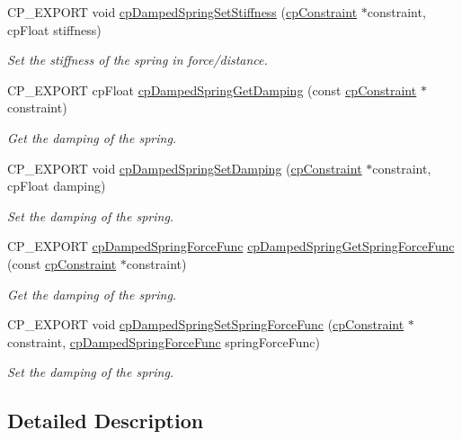\begin{DoxyCompactItemize}
C\+P\+\_\+\+E\+X\+P\+O\+RT void \hyperlink{group__cpDampedSpring_gafb0a681c3c2ec31001bd55be1080beda}{cp\+Damped\+Spring\+Set\+Stiffness} (\hyperlink{structcpConstraint}{cp\+Constraint} $\ast$constraint, cp\+Float stiffness)
\begin{DoxyCompactList}\small\item\em Set the stiffness of the spring in force/distance. \end{DoxyCompactList}\item 
\mbox{\label{group__cpDampedSpring_gaa97fd3bd3901c0366d12bfc8308213b7}} 
C\+P\+\_\+\+E\+X\+P\+O\+RT cp\+Float \hyperlink{group__cpDampedSpring_gaa97fd3bd3901c0366d12bfc8308213b7}{cp\+Damped\+Spring\+Get\+Damping} (const \hyperlink{structcpConstraint}{cp\+Constraint} $\ast$constraint)
\begin{DoxyCompactList}\small\item\em Get the damping of the spring. \end{DoxyCompactList}\item 
\mbox{\label{group__cpDampedSpring_ga88177eeb62c14005496c38c9b6d8669d}} 
C\+P\+\_\+\+E\+X\+P\+O\+RT void \hyperlink{group__cpDampedSpring_ga88177eeb62c14005496c38c9b6d8669d}{cp\+Damped\+Spring\+Set\+Damping} (\hyperlink{structcpConstraint}{cp\+Constraint} $\ast$constraint, cp\+Float damping)
\begin{DoxyCompactList}\small\item\em Set the damping of the spring. \end{DoxyCompactList}\item 
\mbox{\label{group__cpDampedSpring_ga8b377b8e58179c638460d735b568930a}} 
C\+P\+\_\+\+E\+X\+P\+O\+RT \hyperlink{group__cpDampedSpring_gad88d8466e0057d4ad05183fb14fa274d}{cp\+Damped\+Spring\+Force\+Func} \hyperlink{group__cpDampedSpring_ga8b377b8e58179c638460d735b568930a}{cp\+Damped\+Spring\+Get\+Spring\+Force\+Func} (const \hyperlink{structcpConstraint}{cp\+Constraint} $\ast$constraint)
\begin{DoxyCompactList}\small\item\em Get the damping of the spring. \end{DoxyCompactList}\item 
\mbox{\label{group__cpDampedSpring_ga5a663e7d5e0c88f26719af1d543c1db8}} 
C\+P\+\_\+\+E\+X\+P\+O\+RT void \hyperlink{group__cpDampedSpring_ga5a663e7d5e0c88f26719af1d543c1db8}{cp\+Damped\+Spring\+Set\+Spring\+Force\+Func} (\hyperlink{structcpConstraint}{cp\+Constraint} $\ast$constraint, \hyperlink{group__cpDampedSpring_gad88d8466e0057d4ad05183fb14fa274d}{cp\+Damped\+Spring\+Force\+Func} spring\+Force\+Func)
\begin{DoxyCompactList}\small\item\em Set the damping of the spring. \end{DoxyCompactList}\end{DoxyCompactItemize}


\subsection{Detailed Description}
